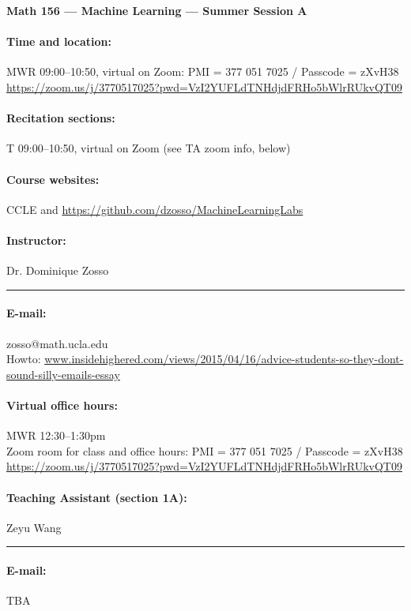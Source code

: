\documentclass[11pt,letter]{article}
\begin{document}
{\Large{\textbf{Math 156 ---  Machine Learning --- Summer Session A}}} 
\paragraph{Time and location:} MWR 09:00--10:50, virtual on Zoom: PMI = 377 051 7025 / Passcode = zXvH38\\
\url{https://zoom.us/j/3770517025?pwd=VzI2YUFLdTNHdjdFRHo5bWlrRUkvQT09}
\paragraph{Recitation sections:} T 09:00--10:50, virtual on Zoom (see TA zoom info, below)


\paragraph{Course websites:} CCLE and \url{https://github.com/dzosso/MachineLearningLabs}

\paragraph{Instructor:}  Dr. Dominique Zosso\hrule
\paragraph{E-mail:} zosso@math.ucla.edu\\
{\footnotesize Howto: \url{www.insidehighered.com/views/2015/04/16/advice-students-so-they-dont-sound-silly-emails-essay}}
\paragraph{Virtual office hours:} MWR 12:30--1:30pm\\
Zoom room for class and office hours: PMI = 377 051 7025 / Passcode = zXvH38\\
\url{https://zoom.us/j/3770517025?pwd=VzI2YUFLdTNHdjdFRHo5bWlrRUkvQT09}



\paragraph{Teaching Assistant (section 1A):}   Zeyu Wang\hrule
\paragraph{E-mail:} TBA
\end{document}
